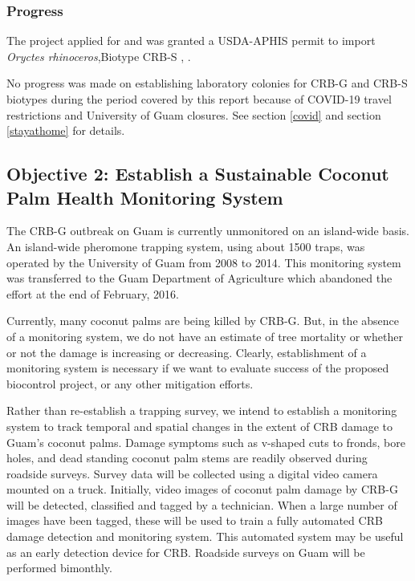 \documentclass[12pt,letterpaper,english,bibliography=totocnumbered,abstract=on]{scrartcl}
\begin{document}
\subsubsection{Progress}



The project applied for and was granted a USDA-APHIS permit to import \textit{Oryctes rhinoceros},Biotype CRB-S \cite{usda-aphis_crb_2019}, \cite{moore_additional_2019}.

No progress was made on establishing laboratory colonies for CRB-G and CRB-S biotypes during the period covered by this report because of COVID-19 travel restrictions and University of Guam closures. See section \ref{covid} and section \ref{stayathome} for details.


\newpage\begin{framed}
\section{Objective 2: Establish a Sustainable Coconut Palm Health Monitoring System}

The CRB-G outbreak on Guam is currently unmonitored on an island-wide basis. An island-wide pheromone trapping system, using about 1500 traps, was operated by the University of Guam from 2008 to 2014. This monitoring system was transferred to the Guam Department of Agriculture which abandoned the effort at the end of February, 2016.

Currently, many coconut palms are being killed by CRB-G. But, in the absence of a monitoring system, we do not have an estimate of tree mortality or whether or not the damage is increasing or decreasing. Clearly, establishment of a monitoring system is necessary if we want to evaluate success of the proposed biocontrol project, or any other mitigation efforts.

Rather than re-establish a trapping survey, we intend to establish a monitoring system to track temporal and spatial changes in the extent of CRB damage to Guam's coconut palms. Damage symptoms such as v-shaped cuts to fronds, bore holes, and dead standing coconut palm stems are readily observed during roadside surveys. Survey data will be collected using a digital video camera mounted on a truck. Initially, video images of coconut palm damage by CRB-G will be detected, classified and tagged by a technician. When a large number of images have been tagged, these will be used to train a fully automated CRB damage detection and monitoring system. This automated system may be useful as an early detection device for CRB. Roadside surveys on Guam will be performed bimonthly.


\end{framed}
\end{document}
